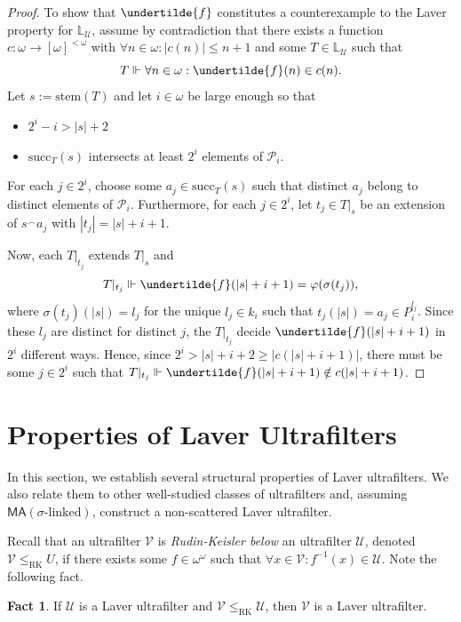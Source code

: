 \documentclass[12pt]{article}
\theoremstyle{definition}
\newtheorem{fct}[nummer]{\sc Fact}
\begin{document}
\begin{proof}
To show that $\undertilde{f}$ constitutes a counterexample to the Laver property for $\mathbb{L}_{\mathcal{U}}$, assume by contradiction that there exists a function $c: \omega \to [\omega]^{<\omega}$ with $\forall n \in \omega: |c(n)|\leq n+1$ and some $T \in \mathbb{L}_{\mathcal{U}}$ such that
\[T \Vdash \forall n \in \omega: \undertilde{f}(n)\in c(n).\]
Let $s:=\text{stem}(T)$ and let $i \in \omega$ be large enough so that
\begin{itemize}
\item[(i)] $2^i - i > |s|+2$
\item[(ii)] $\text{succ}_T(s)$ intersects at least $2^i$ elements of $\mathcal{P}_i$.
\end{itemize}
For each $j \in 2^i$, choose some $a_j \in \text{succ}_T(s)$ such that distinct $a_j$ belong to distinct elements of $\mathcal{P}_i$. Furthermore, for each $j \in 2^i$, let $t_j \in T|_s$ be an extension of $s^{\smallfrown}a_j$ with $|t_j|=|s|+i+1$.

Now, each $T|_{t_j}$ extends $T|_s$ and
\[T|_{t_j} \Vdash \undertilde{f}(|s|+i+1)=\varphi(\sigma(t_j)),\]
where $\sigma(t_j)(|s|)=l_j$ for the unique $l_j \in k_{i}$ such that $t_j(|s|)=a_j\in P_i^{l_j}$. Since these $l_j$ are distinct for distinct $j$, the $T|_{t_j}$ decide $\undertilde{f}(|s|+i+1)$ in $2^i$ different ways. Hence, since $2^i > |s|+i+2\geq |c(|s|+i+1)|$, there must be some $j \in 2^i$ such that $T|_{t_j}\Vdash \undertilde{f}(|s|+i+1)\notin c(|s|+i+1)$.
\end{proof}

\section{Properties of Laver Ultrafilters}\label{section3}

In this section, we establish several structural properties of Laver ultrafilters. We also relate them to other well-studied classes of ultrafilters and, assuming $\textsf{MA}(\sigma\text{-linked})$, construct a non-scattered Laver ultrafilter.

Recall that an ultrafilter $\mathcal{V}$ is \emph{Rudin-Keisler below} an ultrafilter $\mathcal{U}$, denoted $\mathcal{V}\leq_{\text{RK}}\mathcal{}U$, if there exists some $f\in \omega^\omega$ such that $\forall x \in \mathcal{V}: f^{-1}(x)\in \mathcal{U}$. Note the following fact.

\begin{fct}\label{fct:starhereditary}
If $\mathcal{U}$ is a Laver ultrafilter and $\mathcal{V}\leq_{\text{RK}}\mathcal{U}$, then $\mathcal{V}$ is a Laver ultrafilter.
\end{fct}
\end{document}
